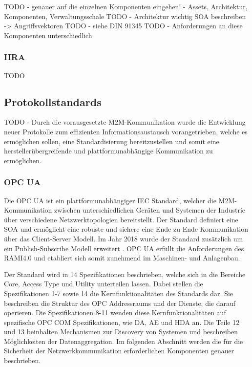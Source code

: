 TODO - genauer auf die einzelnen Komponenten eingehen! - Assets, Architektur, Komponenten, Verwaltungsschale
TODO - Architektur wichtig SOA beschreiben -> Angriffsvektoren
TODO - siehe DIN 91345
TODO - Anforderungen an diese Komponenten unterschiedlich

\subsubsection{IIRA}
TODO

\subsection{Protokollstandards}
TODO - Durch die vorausgesetzte M2M-Kommunikation wurde die Entwicklung neuer Protokolle zum effizienten Informationsaustausch vorangetrieben, welche es ermöglichen sollen, eine Standardisierung bereitzustellen und somit eine herstellerübergreifende und plattformunabhängige Kommunikation zu ermöglichen.

\subsubsection{\ac{OPC UA}}
Die \ac{OPC UA} ist ein plattformunabhängiger \ac{IEC} Standard, welcher die \ac{M2M}-Kommunikation zwischen unterschiedlichen Geräten und Systemen der Industrie über verschiedene Netzwerktopologien bereitstellt. Der Standard definiert eine \ac{SOA} und ermöglicht eine robuste und sichere eine Ende zu Ende Kommunikation über das Client-Server Modell. Im Jahr 2018 wurde der Standard zusätzlich um ein Publish-Subscribe Modell erweitert \cite{hoppe2018}. \ac{OPC UA} erfüllt die Anforderungen des \ac{RAMI4.0} und etabliert sich somit zunehmend im Maschinen- und Anlagenbau.

Der Standard wird in 14 Spezifikationen beschrieben, welche sich in die Bereiche Core, Access Type und Utility unterteilen lassen. Dabei stellen die Spezifikationen 1-7 sowie 14 die Kernfunktionalitäten des Standards dar. Sie beschreiben die Struktur des OPC Addressraums und der Dienste, die darauf operieren. Die Spezifikationen 8-11 wenden diese Kernfunktionalitäten auf spezifische OPC COM Spezifikationen, wie \ac{DA}, \ac{AE} und \ac{HDA} an. Die Teile 12 und 13 beinhalten Mechanismen zur Discovery von Systemen und beschreiben Möglichkeiten der Datenaggregation. Im folgenden Abschnitt werden die für die Sicherheit der Netzwerkkommunikation erforderlichen Komponenten genauer beschrieben.

